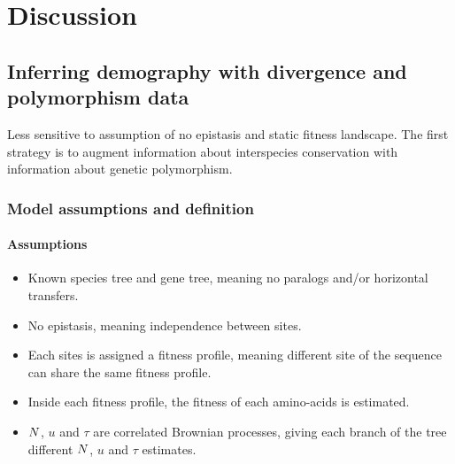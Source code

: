 \chapter{Discussion}

\section{Inferring demography with divergence and polymorphism data}

Less sensitive to assumption of no epistasis and static fitness landscape.
The first strategy is to augment information about interspecies conservation with information about genetic polymorphism.
\subsection{Model assumptions and definition}
\subsubsection{Assumptions}
\begin{itemize}
	\setlength\itemsep{-0.25em}
	\item Known species tree and gene tree, meaning no paralogs and/or horizontal transfers.
	\item No epistasis, meaning independence between sites.
	\item Each sites is assigned a fitness profile, meaning different site of the sequence can share the same fitness profile.
	\item Inside each fitness profile, the fitness of each amino-acids is estimated.
	\item $N$, $u$ and $\tau$ are correlated Brownian processes, giving each branch of the tree different $N$, $u$ and $\tau$ estimates.
\end{itemize}
